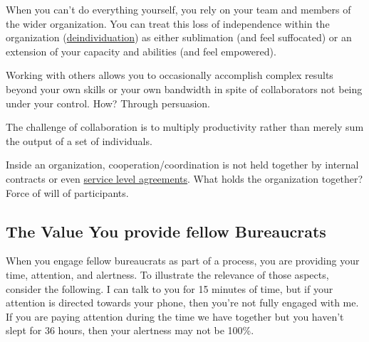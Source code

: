 When you can't do everything yourself, you rely on your team and members of the wider organization. You can treat this loss of independence within the organization (\href{https://en.wikipedia.org/wiki/Deindividuation}{deindividuation}) as either sublimation (and feel suffocated) or an extension of your capacity and abilities (and feel empowered).



Working with others allows you to occasionally accomplish complex results beyond your own skills or your own bandwidth in spite of collaborators not being under your control. How? Through persuasion. 

The challenge of collaboration is to multiply productivity rather than merely sum the output of a set of individuals. 

Inside an organization, cooperation/coordination is not held together by internal contracts or even \href{https://en.wikipedia.org/wiki/Service-level_agreement}{service level agreements}. What holds the organization together? Force of will of participants. 


\subsection*{The Value You provide fellow Bureaucrats}
When you engage fellow bureaucrats as part of a process, you are providing your time, attention, and alertness. To illustrate the relevance of those aspects, consider the following. I can talk to you for 15 minutes of time, but if your attention is directed towards your phone, then you're not fully engaged with me. If you are paying attention during the time we have together but you haven't slept for 36 hours, then your alertness may not be 100\%. 


